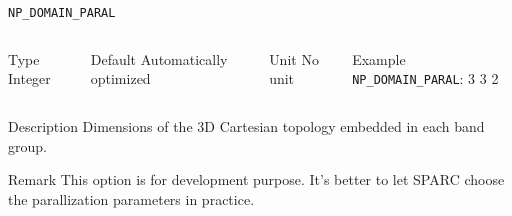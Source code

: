 \begin{frame}[allowframebreaks]{\texttt{NP\_DOMAIN\_PARAL}} \label{NP_DOMAIN_PARAL}
\vspace*{-12pt}
\begin{columns}
\begin{block}{Type}
Integer
\end{block}

\begin{block}{Default}
Automatically optimized
\end{block}

\begin{block}{Unit}
No unit
\end{block}

\begin{block}{Example}
\texttt{NP\_DOMAIN\_PARAL}: 3 3 2
\end{block}
\end{columns}

\begin{block}{Description}
Dimensions of the 3D Cartesian topology embedded in each band group.
\end{block}

\begin{block}{Remark}
This option is for development purpose. It's better to let SPARC choose the parallization parameters in practice.
\end{block}
\end{frame}


